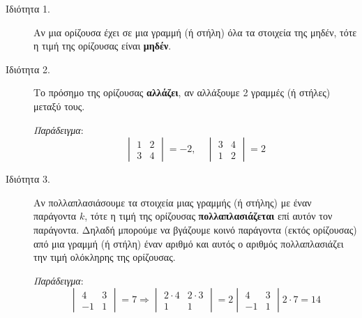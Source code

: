 








\begin{center}
\end{center}

\vspace{\baselineskip}

\begin{description}

    \item[Ιδιότητα 1.] Αν μια ορίζουσα έχει σε μια γραμμή (ή στήλη) όλα τα στοιχεία της μηδέν, τότε η τιμή της ορίζουσας είναι \textbf{μηδέν}.

    \item[Ιδιότητα 2.] Το πρόσημο της ορίζουσας \textbf{αλλάζει}, αν αλλάξουμε 2 γραμμές (ή στήλες) μεταξύ τους.

        \textit{Παράδειγμα}: 
        \[
            \begin{vmatrix}
                1 & 2 \\
                3 & 4 
            \end{vmatrix}
            = -2, \quad 
            \begin{vmatrix}
                3 & 4 \\
                1 & 2 
            \end{vmatrix}=2
        \]

    \item[Ιδιότητα 3.] Αν πολλαπλασιάσουμε τα στοιχεία μιας γραμμής (ή στήλης) με έναν παράγοντα $k$, τότε η τιμή της ορίζουσας \textbf{πολλαπλασιάζεται} επί αυτόν τον παράγοντα. Δηλαδή μπορούμε να βγάζουμε κοινό παράγοντα (εκτός ορίζουσας) από μια γραμμή (ή στήλη) έναν αριθμό και αυτός ο αριθμός πολλαπλασιάζει την τιμή ολόκληρης της ορίζουσας.

        \textit{Παράδειγμα}:
        \[
            \begin{vmatrix}
                4 & 3 \\
                -1 & 1
                \end{vmatrix}=7 \Rightarrow \begin{vmatrix}
                2\cdot 4 & 2\cdot 3 \\
                1 & 1 
                \end{vmatrix}=2 \begin{vmatrix}
                4 & 3 \\
                -1 & 1 
            \end{vmatrix}2\cdot 7 = 14
        \]



\end{description}
